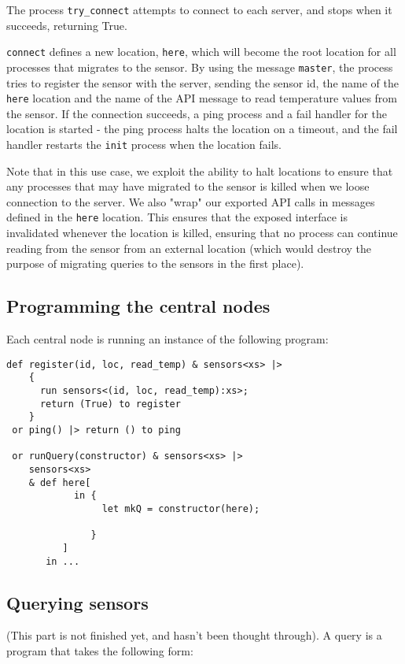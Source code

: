 The process \verb!try_connect! attempts to connect to each server,
and stops when it succeeds, returning True.

\verb!connect! defines a new location, \verb!here!, which will
become the root location for all processes that migrates to the
sensor. By using the message \verb!master!, the process tries to
register the sensor with the server, sending the sensor id, the
name of the \verb!here! location and the name of the API message to
read temperature values from the sensor. If the connection
succeeds, a ping process and a fail handler for the location is
started - the ping process halts the location on a timeout, and the
fail handler restarts the \verb!init! process when the location
fails.

Note that in this use case, we exploit the ability to halt
locations to ensure that any processes that may have migrated to
the sensor is killed when we loose connection to the server. We
also "wrap" our exported API calls in messages defined in the
\verb!here! location. This ensures that the exposed interface is
invalidated whenever the location is killed, ensuring that no
process can continue reading from the sensor from an external
location (which would destroy the purpose of migrating queries to
the sensors in the first place).

\subsection{Programming the central nodes}

Each central node is running an instance of the following program:

\begin{verbatim}
def register(id, loc, read_temp) & sensors<xs> |>
    {
      run sensors<(id, loc, read_temp):xs>;
      return (True) to register
    }
 or ping() |> return () to ping

 or runQuery(constructor) & sensors<xs> |>
    sensors<xs>
    & def here[
            in {
                 let mkQ = constructor(here);

               }
          ]
       in ...
\end{verbatim}
\subsection{Querying sensors}

(This part is not finished yet, and hasn't been thought through). A
query is a program that takes the following form:

